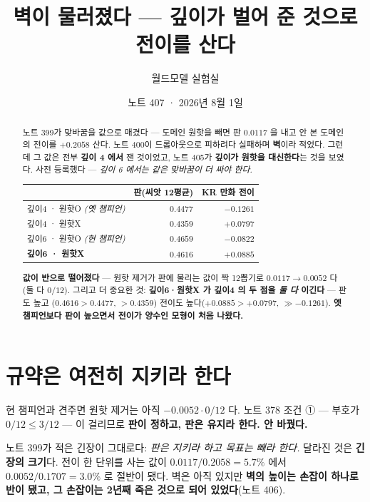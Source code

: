 \documentclass[11pt]{article}
\begin{document}
\title{벽이 물러졌다 --- 깊이가 벌어 준 것으로 전이를 산다}
\author{월드모델 실험실}
\date{노트 407 · 2026년 8월 1일}
\maketitle

\begin{abstract}
노트 399가 맞바꿈을 값으로 매겼다 --- 도메인 원핫을 빼면 판 $0.0117$ 을
내고 안 본 도메인의 전이를 $+0.2058$ 산다. 노트 400이 드롭아웃으로
피하려다 실패하며 \textbf{벽}이라 적었다. 그런데 그 값은 전부
\textbf{깊이 4 에서} 잰 것이었고, 노트 405가 \textbf{깊이가 원핫을
대신한다}는 것을 보였다. 사전 등록했다 --- \emph{깊이 6 에서는 같은
맞바꿈이 더 싸야 한다.}

\begin{center}
\begin{tabular}{lrr}
\hline
 & 판(씨앗 12평균) & KR 만화 전이 \\
\hline
깊이4 · 원핫O \emph{(옛 챔피언)} & $0.4477$ & $-0.1261$ \\
깊이4 · 원핫X & $0.4359$ & $+0.0797$ \\
깊이6 · 원핫O \emph{(현 챔피언)} & $\mathbf{0.4659}$ & $-0.0822$ \\
\textbf{깊이6 · 원핫X} & $0.4616$ & $\mathbf{+0.0885}$ \\
\hline
\end{tabular}
\end{center}

\textbf{값이 반으로 떨어졌다} --- 원핫 제거가 판에 물리는 값이 짝 12뽑기로
$0.0117 \to \mathbf{0.0052}$ 다(둘 다 $0/12$). 그리고 더 중요한 것:
\textbf{깊이6·원핫X 가 깊이4 의 두 점을 \emph{둘 다} 이긴다} --- 판도 높고
($0.4616 > 0.4477$, $> 0.4359$) 전이도 높다($+0.0885 > +0.0797$,
$\gg -0.1261$). \textbf{옛 챔피언보다 판이 높으면서 전이가 양수인 모형이
처음 나왔다.}
\end{abstract}

\section{규약은 여전히 지키라 한다}

현 챔피언과 견주면 원핫 제거는 아직 $-0.0052 \cdot 0/12$ 다. 노트 378
조건 ① --- 부호가 $0/12 \le 3/12$ --- 이 걸리므로 \textbf{판이 정하고,
판은 유지라 한다. 안 바꿨다.}

노트 399가 적은 긴장이 그대로다: \emph{판은 지키라 하고 목표는 빼라 한다.}
달라진 것은 \textbf{긴장의 크기}다. 전이 한 단위를 사는 값이
$0.0117/0.2058 = 5.7\%$ 에서 $0.0052/0.1707 = \mathbf{3.0\%}$ 로 절반이
됐다. 벽은 아직 있지만 \textbf{벽의 높이는 손잡이 하나로 반이 됐고, 그
손잡이는 2년째 죽은 것으로 되어 있었다}(노트 406).
\end{document}
